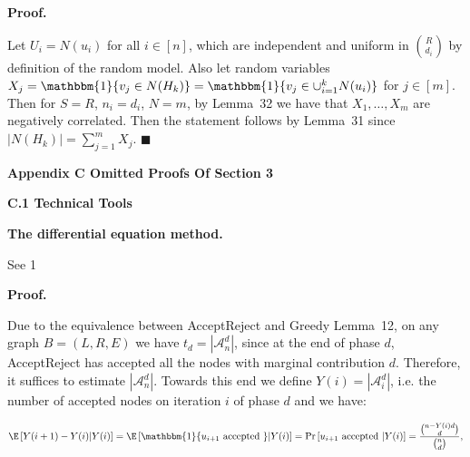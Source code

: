 \par\medskip\noindent\textbf{Proof.}\par



Let $U_{i}=N(u_{i})$ for all $i\in[n]$, which are independent and uniform in $\binom{R}{d_{i}}$ by definition of the random model.
Also let random variables $X_{j}=\mathbbm{1}\{v_{j}\in N(H_{k})\}=\mathbbm{1}\{v_{j}\in\cup_{i=1}^{k}N(u_{i})\}$ for $j\in[m]$.
Then for $S=R$, $n_{i}=d_{i}$, $N=m$, by Lemma 32 we have that $X_{1},\dots,X_{m}$ are negatively correlated.
Then the statement follows by Lemma 31 since $|N(H_{k})|=\sum_{j=1}^{m}X_{j}$.
\ensuremath{\blacksquare}\par








\par\medskip\noindent\textbf{Appendix C Omitted Proofs Of Section 3}\par




\par\medskip\noindent\textbf{C.1 Technical Tools}\par




\par\medskip\noindent\textbf{The differential equation method.}\par




See 1\par




\par\medskip\noindent\textbf{Proof.}\par



Due to the equivalence between AcceptReject and Greedy Lemma 12, on any graph $B=(L,R,E)$ we have $t_{d}=|\mathcal{A}^{d}_{n}|$, since at the end of phase $d$, AcceptReject has accepted all the nodes with marginal contribution $d$. Therefore, it suffices to estimate $|\mathcal{A}^{d}_{n}|$. Towards this end we define $Y(i)=|\mathcal{A}^{d}_{i}|$, i.e. the number of accepted nodes on iteration $i$ of phase $d$ and we have:\par


\[\begin{gathered}
\displaystyle\E\left[Y(i+1)-Y(i)\middle|Y(i)\right]=\E\left[\mathbbm{1}\{u_{i+1}\text{ accepted }\}\middle|Y(i)\right]=\Pr\left[u_{i+1}\text{ accepted }\middle|Y(i)\right]=\frac{\binom{n-Y(i)d}{d}}{\binom{n}{d}},
\end{gathered}\]


